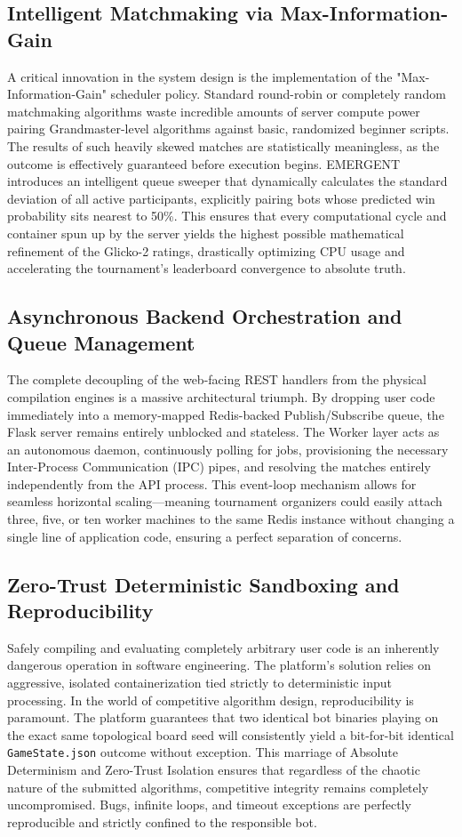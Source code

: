\documentclass[12pt,a4paper]{report}
\begin{document}
\subsection{Intelligent Matchmaking via Max-Information-Gain}
A critical innovation in the system design is the implementation of the "Max-Information-Gain" scheduler policy. Standard round-robin or completely random matchmaking algorithms waste incredible amounts of server compute power pairing Grandmaster-level algorithms against basic, randomized beginner scripts. The results of such heavily skewed matches are statistically meaningless, as the outcome is effectively guaranteed before execution begins. EMERGENT introduces an intelligent queue sweeper that dynamically calculates the standard deviation of all active participants, explicitly pairing bots whose predicted win probability sits nearest to 50\%. This ensures that every computational cycle and container spun up by the server yields the highest possible mathematical refinement of the Glicko-2 ratings, drastically optimizing CPU usage and accelerating the tournament's leaderboard convergence to absolute truth.

\subsection{Asynchronous Backend Orchestration and Queue Management}
The complete decoupling of the web-facing REST handlers from the physical compilation engines is a massive architectural triumph. By dropping user code immediately into a memory-mapped Redis-backed Publish/Subscribe queue, the Flask server remains entirely unblocked and stateless. The Worker layer acts as an autonomous daemon, continuously polling for jobs, provisioning the necessary Inter-Process Communication (IPC) pipes, and resolving the matches entirely independently from the API process. This event-loop mechanism allows for seamless horizontal scaling—meaning tournament organizers could easily attach three, five, or ten worker machines to the same Redis instance without changing a single line of application code, ensuring a perfect separation of concerns.

\subsection{Zero-Trust Deterministic Sandboxing and Reproducibility}
Safely compiling and evaluating completely arbitrary user code is an inherently dangerous operation in software engineering. The platform's solution relies on aggressive, isolated containerization tied strictly to deterministic input processing. In the world of competitive algorithm design, reproducibility is paramount. The platform guarantees that two identical bot binaries playing on the exact same topological board seed will consistently yield a bit-for-bit identical \texttt{GameState.json} outcome without exception. This marriage of Absolute Determinism and Zero-Trust Isolation ensures that regardless of the chaotic nature of the submitted algorithms, competitive integrity remains completely uncompromised. Bugs, infinite loops, and timeout exceptions are perfectly reproducible and strictly confined to the responsible bot.
\end{document}
